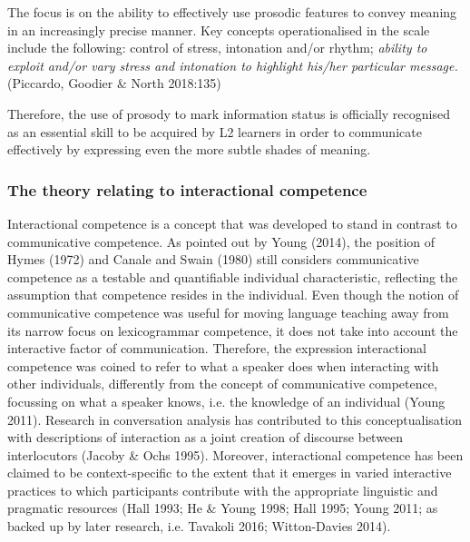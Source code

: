 \begin{styleQuote}
The focus is on the ability to effectively use prosodic features to convey meaning in an increasingly precise manner. Key concepts operationalised in the scale include the following: control of stress, intonation and/or rhythm; \textit{ability to exploit and/or vary stress and intonation to highlight his/her particular message.} (Piccardo, Goodier \& North 2018:135)
\end{styleQuote}

\begin{styleStandard}
Therefore, the use of prosody to mark information status is officially recognised as an essential skill to be acquired by L2 learners in order to communicate effectively by expressing even the more subtle shades of meaning.
\end{styleStandard}

\subsubsection{The theory relating to interactional competence}
\hypertarget{Toc191305875}{}\begin{styleStandard}
Interactional competence is a concept that was developed to stand in contrast to communicative competence. As pointed out by Young (2014), the position of Hymes (1972) and Canale and Swain (1980) still considers communicative competence as a testable and quantifiable individual characteristic, reflecting the assumption that competence resides in the individual. Even though the notion of communicative competence was useful for moving language teaching away from its narrow focus on lexicogrammar competence, it does not take into account the interactive factor of communication. Therefore, the expression interactional competence was coined to refer to what a speaker does when interacting with other individuals, differently from the concept of communicative competence, focussing on what a speaker knows, i.e. the knowledge of an individual (Young 2011). Research in conversation analysis has contributed to this conceptualisation with descriptions of interaction as a joint creation of discourse between interlocutors (Jacoby \& Ochs 1995). Moreover, interactional competence has been claimed to be context-specific to the extent that it emerges in varied interactive practices to which participants contribute with the appropriate linguistic and pragmatic resources (Hall 1993; He \& Young 1998; Hall 1995; Young 2011; as backed up by later research, i.e. Tavakoli 2016; Witton-Davies 2014).
\end{styleStandard}

